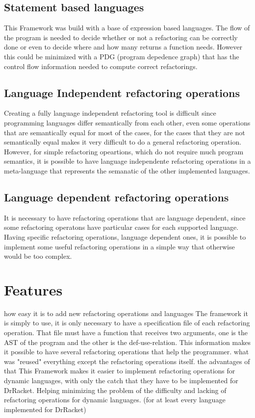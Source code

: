 \subsection{Statement based languages}
This Framework was build with a base of expression based languages. The flow of
the program is needed to decide whether or not a refactoring can be correctly done
or even to decide where and how many returns a function needs. However this could
be minimized with a PDG (program depedence graph) that has the control flow information
needed to compute correct refactorings.

\subsection{Language Independent refactoring operations}
Creating a fully language independent refactoring tool is difficult since programming
languages differ semantically from each other, even some operations that are semantically
equal for most of the cases, for the cases that they are not semantically equal makes it very
difficult to do a general refactoring operation.
However, for simple refactoring opeartions, which do not require much program semantics,
it is possible to have language independente refactoring operations in a meta-language that
represents the semanatic of the other implemented languages. %

\subsection{Language dependent refactoring operations}
It is necessary to have refactoring operations that are language dependent, since
some refactoring operatons have particular cases for each supported language.
Having specific refactoring operations, language dependent ones, it is possible
to implement some useful refactoring operations in a simple way that otherwise would
be too complex.

\section{Features} %
how easy it is to add new refactoring operations and languages
The framework it is simply to use, it is only necessary to have a specification file
of each refactoring operation.
That file must have a function that receives two arguments,
one is the AST of the program and the other is the def-use-relation.
This information makes it possible to have several refactoring operations that help
the programmer.
what was "reused"
everything except the refactoring operations itself.
the advantages of that
This Framework makes it easier to implement refactoring operations for dynamic languages,
with only the catch that they have to be implemented for DrRacket. Helping minimizing
the problem of the difficulty and lacking of refactoring operations for dynamic languages.
(for at least every language implemented for DrRacket)

